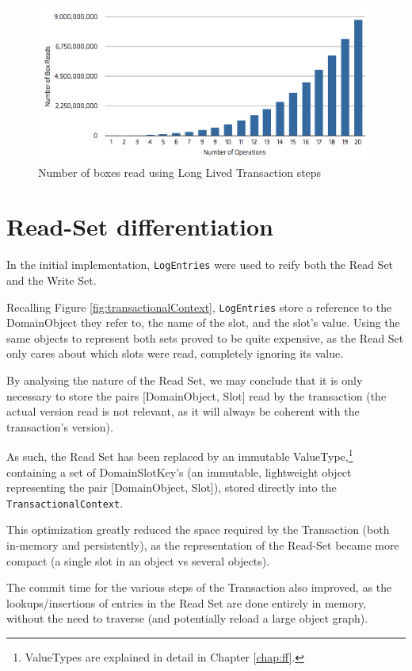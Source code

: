 \begin{figure}
\centering
\includegraphics[width=0.9\linewidth]{box-long-v1}
\caption{Number of boxes read using Long Lived Transaction steps}
\label{fig:long-box-v1}
\end{figure}

\section{Read-Set differentiation}

In the initial implementation, \texttt{LogEntries} were used to reify
both the Read Set and the Write Set.

Recalling Figure \ref{fig:transactionalContext}, \texttt{LogEntries}
store a reference to the DomainObject they refer to, the name of the
slot, and the slot's value. Using the same objects to represent both
sets proved to be quite expensive, as the Read Set only cares about
which slots were read, completely ignoring its value.

By analysing the nature of the Read Set, we may conclude that it is
only necessary to store the pairs [DomainObject, Slot] read by the
transaction (the actual version read is not relevant, as it will
always be coherent with the transaction's version).

As such, the Read Set has been replaced by an immutable
ValueType,\footnote{ValueTypes are explained in detail in Chapter
  \ref{chap:ff}.} containing a set of DomainSlotKey's (an immutable,
lightweight object representing the pair [DomainObject, Slot]), stored
directly into the \texttt{TransactionalContext}.

This optimization greatly reduced the space required by the
Transaction (both in-memory and persistently), as the representation
of the Read-Set became more compact (a single slot in an object vs
several objects).

The commit time for the various steps of the Transaction also
improved, as the lookups/insertions of entries in the Read Set are
done entirely in memory, without the need to traverse (and
potentially reload a large object graph).


